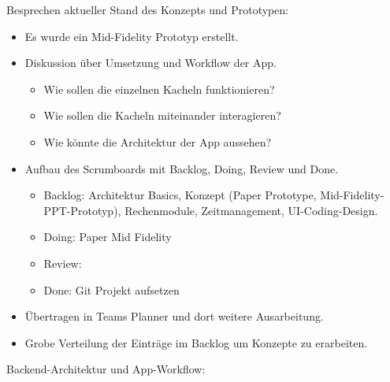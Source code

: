 
Besprechen aktueller Stand des Konzepts und Prototypen:

\begin{itemize}
	\item Es wurde ein Mid-Fidelity Prototyp erstellt. 
	\item Diskussion über Umsetzung und Workflow der App.
	\begin{itemize}
		\item Wie sollen die einzelnen Kacheln funktionieren?
		\item Wie sollen die Kacheln miteinander interagieren?
		\item Wie könnte die Architektur der App aussehen?
	\end{itemize}
\end{itemize}


\begin{itemize}
	\item Aufbau des Scrumboards mit Backlog, Doing, Review und Done.
	\begin{itemize}
		\item Backlog: Architektur Basics, Konzept (Paper Prototype, Mid-Fidelity-PPT-Prototyp), Rechenmodule, Zeitmanagement, UI-Coding-Design.
		\item Doing: Paper Mid Fidelity
		\item Review:
		\item Done: Git Projekt aufsetzen
	\end{itemize}
	\item Übertragen in Teams Planner und dort weitere Ausarbeitung.
	\item Grobe Verteilung der Einträge im Backlog um Konzepte zu erarbeiten.
\end{itemize}


Backend-Architektur und App-Workflow:

